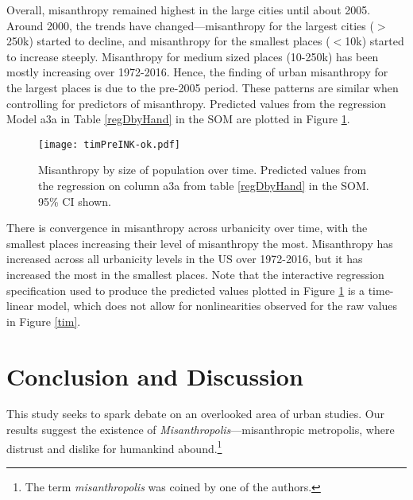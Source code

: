 \documentclass[11pt, letterpaper]{article}
\begin{document}
\begin{spacing}{1.4}
Overall, misanthropy remained highest in the large cities until
about 2005. Around 2000, the trends have changed---misanthropy for the largest
cities ($>$250k) started to decline, and misanthropy for the smallest places
($<$10k) started to increase steeply. Misanthropy for medium
sized places (10-250k) has been mostly increasing over 1972-2016. Hence, the
finding of urban misanthropy for the largest places is due to the pre-2005 period.
%
These patterns are similar when controlling for predictors of
misanthropy. Predicted values from the regression Model a3a in Table \ref{regDbyHand} in
the SOM are plotted in Figure \ref{timPre}. 


\begin{figure}[H]
  \texttt{[image: timPreINK-ok.pdf]}\centering
\caption{Misanthropy by size of population over time. Predicted values from the regression on column a3a from table \ref{regDbyHand} in the SOM. 95\% CI shown.}\label{timPre}%
\end{figure}

There is convergence in misanthropy across urbanicity over time, with the
smallest places increasing their level of misanthropy the most. Misanthropy has
increased across all urbanicity levels in the US over 1972-2016, but it has
increased the most in the smallest places. %
 Note that the interactive regression
specification used to produce the predicted values plotted in Figure
\ref{timPre} is a time-linear model, which does not allow for nonlinearities observed for the raw values in Figure \ref{tim}.

%


\section*{Conclusion and Discussion}

This study seeks to spark debate on an overlooked area of urban studies. 
 Our results suggest the existence of
\emph{Misanthropolis}---misanthropic metropolis,  where distrust and dislike for humankind
abound.\footnote{The term \emph{misanthropolis} was coined by one of the authors.}



\end{spacing}
\end{document}
